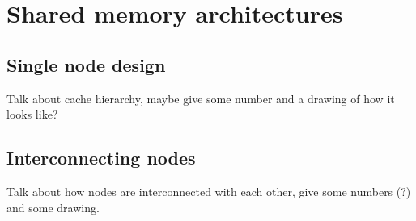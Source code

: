 \section{Shared memory architectures}\label{sec:context:numa}



\subsection{Single node design}

Talk about cache hierarchy, maybe give some number and a drawing of how it looks like?

\subsection{Interconnecting nodes}

Talk about how nodes are interconnected with each other, give some numbers (?) and some drawing.

